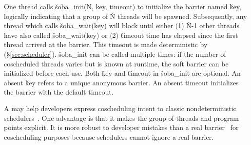 \noindent
One thread calls \v{soba\_init(N, key, timeout)} to initialize the barrier
named \v{key}, logically indicating that a group of \v{N} threads will
be spawned.  Subsequently, any thread which calls \v{soba\_wait(key)}
will block until either (1) \v{N}-1 other threads have also called
\v{soba\_wait(key)} or (2) \v{timeout} time has elapsed since the first
thread arrived at the barrier.  This timeout is made deterministic by \parrot
(\S\ref{sec:scheduler}).  \v{soba\_init} can be called multiple
times: if the number of coscheduled threads varies but is known at runtime,
the soft barrier can be initialized before each use.  Both \v{key} and
\v{timeout} in \v{soba\_init} are optional.  An absent \v{key} refers to a
unique anonymous barrier.  An absent \v{timeout} initializes the barrier
with the default timeout.

A \compute may help developers express coscheduling intent to classic
nondeterministic schedulers~\cite{coschedule}.  One advantage is that it
makes the group of threads and program points explicit.  It is more robust
to developer mistakes than a real barrier~\cite{coschedule:sigmetrics96}
for coscheduling purposes because schedulers cannot ignore a real barrier.




